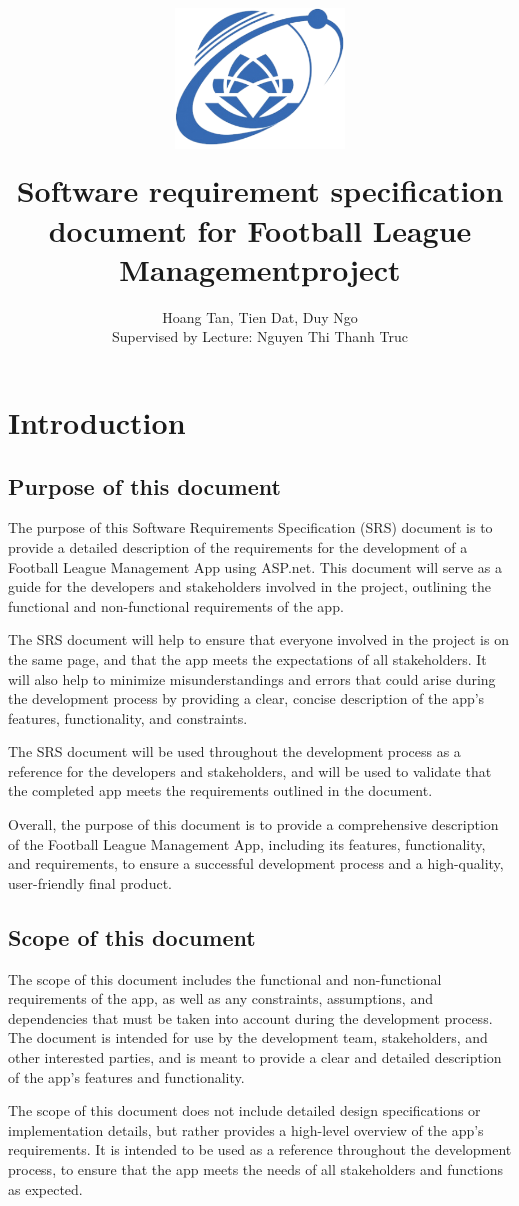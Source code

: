 \documentclass[12pt]{article}
\title{
{\includegraphics[width=4.5cm, height=4.5cm]{Figs/logo-uit-300x248.png}
}
\\
{Software requirement specification document for Football League Managementproject}
}
\author{Hoang Tan, Tien Dat, Duy Ngo \\ Supervised by Lecture: Nguyen Thi Thanh Truc }
\begin{document}
\maketitle
\tableofcontents
\section{Introduction}
\subsection{Purpose of this document}
The purpose of this Software Requirements Specification (SRS) document is to provide a detailed description of the requirements for the development of a Football League Management App using ASP.net. This document will serve as a guide for the developers and stakeholders involved in the project, outlining the functional and non-functional requirements of the app.

The SRS document will help to ensure that everyone involved in the project is on the same page, and that the app meets the expectations of all stakeholders. It will also help to minimize misunderstandings and errors that could arise during the development process by providing a clear, concise description of the app's features, functionality, and constraints.

The SRS document will be used throughout the development process as a reference for the developers and stakeholders, and will be used to validate that the completed app meets the requirements outlined in the document.

Overall, the purpose of this document is to provide a comprehensive description of the Football League Management App, including its features, functionality, and requirements, to ensure a successful development process and a high-quality, user-friendly final product.
\subsection{ Scope of this document}
The scope of this document includes the functional and non-functional requirements of the app, as well as any constraints, assumptions, and dependencies that must be taken into account during the development process. The document is intended for use by the development team, stakeholders, and other interested parties, and is meant to provide a clear and detailed description of the app's features and functionality.

The scope of this document does not include detailed design specifications or implementation details, but rather provides a high-level overview of the app's requirements. It is intended to be used as a reference throughout the development process, to ensure that the app meets the needs of all stakeholders and functions as expected.
\end{document}
